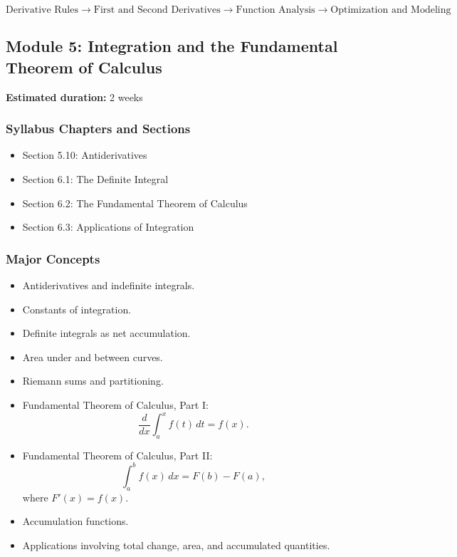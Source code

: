 \documentclass[11pt]{article}
\begin{document}
\[
\text{Derivative Rules}
\longrightarrow
\text{First and Second Derivatives}
\longrightarrow
\text{Function Analysis}
\longrightarrow
\text{Optimization and Modeling}
\]

\subsection{Module 5: Integration and the Fundamental Theorem of Calculus}

\textbf{Estimated duration:} 2 weeks

\subsubsection{Syllabus Chapters and Sections}

\begin{itemize}
    \item Section 5.10: Antiderivatives
    \item Section 6.1: The Definite Integral
    \item Section 6.2: The Fundamental Theorem of Calculus
    \item Section 6.3: Applications of Integration
\end{itemize}

\subsubsection{Major Concepts}

\begin{itemize}
    \item Antiderivatives and indefinite integrals.
    \item Constants of integration.
    \item Definite integrals as net accumulation.
    \item Area under and between curves.
    \item Riemann sums and partitioning.
    \item Fundamental Theorem of Calculus, Part I:
    \[
        \frac{d}{dx}\int_a^x f(t)\,dt = f(x).
    \]
    \item Fundamental Theorem of Calculus, Part II:
    \[
        \int_a^b f(x)\,dx = F(b)-F(a),
    \]
    where $F'(x)=f(x)$.
    \item Accumulation functions.
    \item Applications involving total change, area, and accumulated quantities.
\end{itemize}
\end{document}
